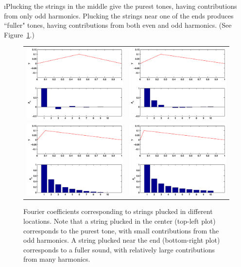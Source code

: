\i Plucking the strings in the middle give the 
purest tones, having contributions from only odd
harmonics.
Plucking the strings near one of the ends 
produces ``fuller" tones, having contributions from
both even and odd harmonics.
(See Figure~\ref{f:pluckedstrings}.)
%
\begin{figure}[htbp]
\begin{center}
\begin{tabular}{cc}
\includegraphics[width=.5\textwidth]{pluckedstringharmonics1_2.pdf} &
\includegraphics[width=.5\textwidth]{pluckedstringharmonics1_4.pdf}
\\
\includegraphics[width=.5\textwidth]{pluckedstringharmonics1_10.pdf} &
\includegraphics[width=.5\textwidth]{pluckedstringharmonics1_20.pdf} 
\end{tabular}
\caption{Fourier coefficients corresponding to strings
plucked in different locations.
Note that a string plucked in the center (top-left plot)
corresponds to the purest tone, with small contributions 
from the odd harmonics.
A string plucked near the end (bottom-right plot) corresponds
to a fuller sound, with relatively large contributions from 
many harmonics.}
\label{f:pluckedstrings}
\end{center}
\end{figure}

